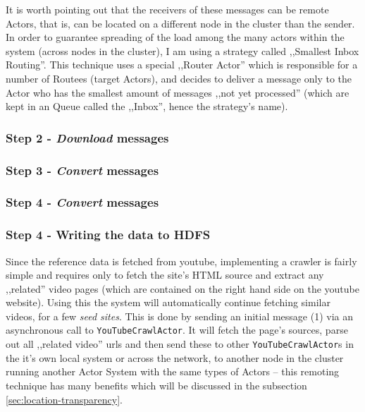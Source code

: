 It is worth pointing out that the receivers of these messages can be remote Actors, that is, can be located on a different node in the cluster than the sender. In order to guarantee spreading of the load among the many actors within the system (across nodes in the cluster), I am using a strategy called ,,Smallest Inbox Routing''. This technique uses a special ,,Router Actor'' which is responsible for a number of Routees (target Actors), and decides to deliver a message
only to the Actor who has the smallest amount of messages ,,not yet processed'' (which are kept in an Queue called the ,,Inbox'', hence the strategy's name).

\subsubsection{Step 2 - \textit{Download} messages}


\subsubsection{Step 3 - \textit{Convert} messages}
\subsubsection{Step 4 - \textit{Convert} messages}
\subsubsection{Step 4 - Writing the data to HDFS}

Since the reference data is fetched from youtube, implementing a crawler is fairly simple and requires only to fetch the site's HTML source and extract any ,,related'' video pages (which are contained on the right hand side on the youtube website). Using this the system will automatically continue fetching similar videos, for a few \textit{seed sites}. This is done by sending an initial message (1) via an asynchronous call to \verb|YouTubeCrawlActor|. It will fetch the page's sources, parse out all ,,related video'' urls and then send these to other \verb|YouTubeCrawlActor|s in the it's own local system or across the network, to another node in the cluster running another Actor System with the same types of Actors -- this remoting technique has many benefits which will be discussed in the subsection \ref{sec:location-transparency}.

